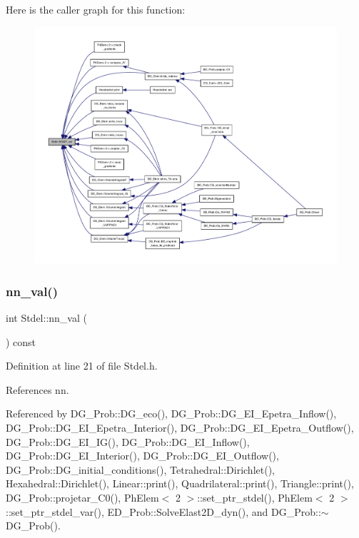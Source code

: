 Here is the caller graph for this function\+:
\nopagebreak
\begin{figure}[H]
\begin{center}
\leavevmode
\includegraphics[width=350pt]{classStdel_a2f964819235e0a55fd60733518b592f2_icgraph}
\end{center}
\end{figure}
\mbox{\label{classStdel_a6086dceed8fe3dd410da0d6b84f02377}} 
\subsubsection{\texorpdfstring{nn\+\_\+val()}{nn\_val()}}
{\footnotesize\ttfamily int Stdel\+::nn\+\_\+val (\begin{DoxyParamCaption}{ }\end{DoxyParamCaption}) const\hspace{0.3cm}{\ttfamily [inline]}}



Definition at line 21 of file Stdel.\+h.



References nn.



Referenced by D\+G\+\_\+\+Prob\+::\+D\+G\+\_\+eco(), D\+G\+\_\+\+Prob\+::\+D\+G\+\_\+\+E\+I\+\_\+\+Epetra\+\_\+\+Inflow(), D\+G\+\_\+\+Prob\+::\+D\+G\+\_\+\+E\+I\+\_\+\+Epetra\+\_\+\+Interior(), D\+G\+\_\+\+Prob\+::\+D\+G\+\_\+\+E\+I\+\_\+\+Epetra\+\_\+\+Outflow(), D\+G\+\_\+\+Prob\+::\+D\+G\+\_\+\+E\+I\+\_\+\+I\+G(), D\+G\+\_\+\+Prob\+::\+D\+G\+\_\+\+E\+I\+\_\+\+Inflow(), D\+G\+\_\+\+Prob\+::\+D\+G\+\_\+\+E\+I\+\_\+\+Interior(), D\+G\+\_\+\+Prob\+::\+D\+G\+\_\+\+E\+I\+\_\+\+Outflow(), D\+G\+\_\+\+Prob\+::\+D\+G\+\_\+initial\+\_\+conditions(), Tetrahedral\+::\+Dirichlet(), Hexahedral\+::\+Dirichlet(), Linear\+::print(), Quadrilateral\+::print(), Triangle\+::print(), D\+G\+\_\+\+Prob\+::projetar\+\_\+\+C0(), Ph\+Elem$<$ 2 $>$\+::set\+\_\+ptr\+\_\+stdel(), Ph\+Elem$<$ 2 $>$\+::set\+\_\+ptr\+\_\+stdel\+\_\+var(), E\+D\+\_\+\+Prob\+::\+Solve\+Elast2\+D\+\_\+dyn(), and D\+G\+\_\+\+Prob\+::$\sim$\+D\+G\+\_\+\+Prob().

